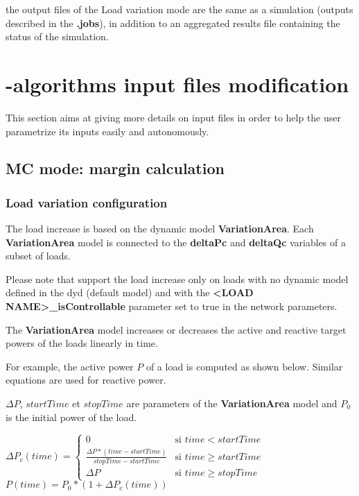 \documentclass[a4paper, 12pt]{report}
\begin{document}
the output files of the Load variation mode are the same as a \Dynawo simulation (outputs described in the \textbf{.jobs}), in addition to an aggregated 
results file containing the status of the simulation.

\section[Dynawo input files modification]{\Dynawo-algorithms input files modification}

This section aims at giving more details on input files in order to help the user parametrize its inputs easily and autonomously.

\subsection{MC mode: margin calculation}
\subsubsection{Load variation configuration}
\label{Dynawo_Algorithms_Inputs_Load_Variation}
The load increase is based on the dynamic model \textbf{VariationArea}. Each \textbf{VariationArea} model is connected to the 
\textbf{deltaPc} and \textbf{deltaQc} variables of a subset of loads. 

Please note that \Dynawo support the load increase only on 
loads with no dynamic model defined in the dyd (default model) and with the \textbf{<LOAD NAME>\_isControllable} parameter set to true in the network parameters. 

The \textbf{VariationArea} model increases 
or decreases the active and reactive target powers of the loads linearly in time.

For example, the active power $P$ of a load is computed as shown below. Similar equations are used for reactive power.

$\Delta P$, $startTime$ et $stopTime$ are parameters of the \textbf{VariationArea} model and $P_0$ is the initial power of the load.

\begin{center}
$\Delta P_c(time) = \left\{
    \begin{array}{ll}
        0 & \mbox{si } time<startTime \\
        \frac{\Delta P*(time-startTime)}{stopTime-startTime} & \mbox{si } time \geq startTime \\
        \Delta P & \mbox{si } time \geq stopTime
    \end{array}
\right. $\\
$P(time) = P_0*(1+\Delta P_c(time)) $
\end{center}
\end{document}
